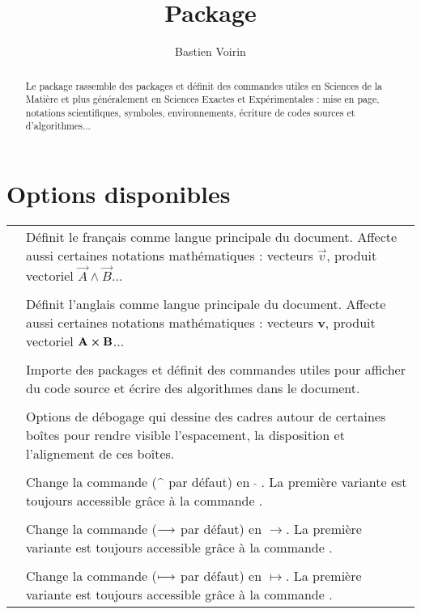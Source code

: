 \documentclass{article}
\title{Package \raw{enssdm}}
\author{Bastien Voirin}
\begin{document}
\maketitle

\begin{abstract}
    Le package  rassemble des packages et définit des commandes utiles en Sciences de la Matière et plus généralement en Sciences Exactes et Expérimentales : mise en page, notations scientifiques, symboles, environnements, écriture de codes sources et d'algorithmes...
\end{abstract}

\tableofcontents

\clearpage
\section{Options disponibles}

\begin{xltabular}[l]{0.825\textwidth}{@{} lX @{}}
 & Définit le français comme langue principale du document. Affecte aussi certaines notations mathématiques : vecteurs $\vec{v}$, produit vectoriel $\vec{A}\wedge\vec{B}$...\\\\
 & Définit l'anglais comme langue principale du document. Affecte aussi certaines notations mathématiques : vecteurs $\mathbf{v}$, produit vectoriel $\mathbf{A}\cross\mathbf{B}$...\\\\
 & Importe des packages et définit des commandes utiles pour afficher du code source et écrire des algorithmes dans le document.\\\\
 & Options de débogage qui dessine des cadres autour de certaines boîtes pour rendre visible l'espacement, la disposition et l'alignement de ces boîtes.\\\\
 & Change la commande \raw{\hat} ($\,\oldhat{\:}\,$ par défaut) en $\,\widehat{\:}\,$. La première variante est toujours accessible grâce à la commande \raw{\oldhat}.\\\\
 & Change la commande \raw{\to} ($\oldto$ par défaut) en $\longrightarrow$. La première variante est toujours accessible grâce à la commande \raw{\oldto}.\\\\
 & Change la commande \raw{\mapsto} ($\oldmapsto$ par défaut) en $\longmapsto$.  La première variante est toujours accessible grâce à la commande \raw{\oldmapsto}.
\end{xltabular}
\end{document}
